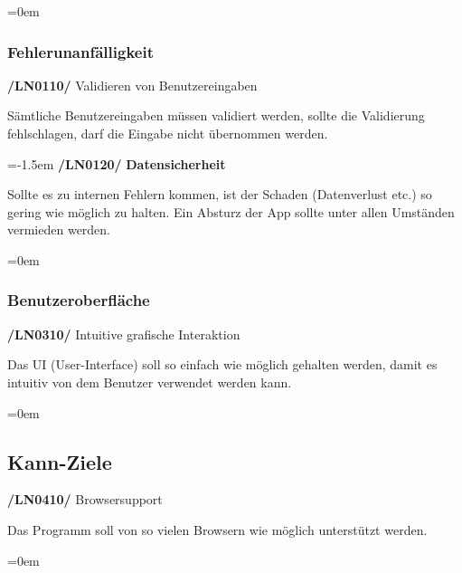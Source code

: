 \documentclass[11pt,a4paper]{report}
\begin{document}
\leftskip=0em
\subsubsection{Fehlerunanfälligkeit}

\textbf{/LN0110/} Validieren von Benutzereingaben
\par
\begingroup
\leftskip=1cm
\noindent Sämtliche Benutzereingaben müssen validiert werden, sollte die Validierung fehlschlagen, darf die Eingabe nicht übernommen werden.\\
\par
\endgroup

\leftskip=-1.5em
\textbf{/LN0120/} \textbf{Datensicherheit}
\par
\begingroup
\leftskip=1cm
\noindent Sollte es zu internen Fehlern kommen, ist der Schaden (Datenverlust etc.) so gering wie möglich zu halten.
Ein Absturz der App sollte unter allen Umständen vermieden werden.\\
\par
\endgroup

\leftskip=0em
\subsubsection{Benutzeroberfläche}

\textbf{/LN0310/} Intuitive grafische Interaktion
\par
\begingroup
\leftskip=1cm
\noindent Das UI (User-Interface) soll so einfach wie möglich gehalten werden, damit es intuitiv von dem Benutzer verwendet werden kann.\\
\par
\endgroup

\leftskip=0em
\subsection{Kann-Ziele}
\textbf{/LN0410/} Browsersupport
\par
\begingroup
\leftskip=1cm
\noindent Das Programm soll von so vielen Browsern wie möglich unterstützt werden.\\
\par
\endgroup

\newpage
\leftskip=0em
\end{document}
